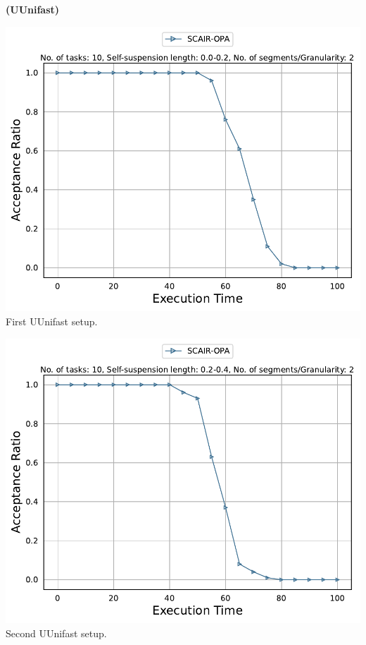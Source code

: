 \documentclass[]{article}
\begin{document}
	\begin{minipage}[t]{0.48\linewidth}
		\centering
		\textbf{(UUnifast)}
		\vspace{0.3cm}
		
		\includegraphics[width=\linewidth]{SCAIR-OPA[2][0.0-0.2][10].pdf}
		First UUnifast setup.
		\vspace{0.3cm}
		
		\includegraphics[width=\linewidth]{SCAIR-OPA[2][0.2-0.4][10].pdf}
		Second UUnifast setup.
		\vspace{0.3cm}


\end{minipage}
\end{document}
